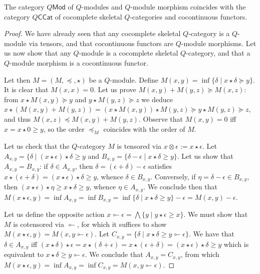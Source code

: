 \begin{theorem}\label{thm:equivalence}
The category $Q\mathsf{Mod}$ of $Q$-modules and $Q$-module morphism coincides with the category $Q\mathsf{CCat}$ of cocomplete skeletal $Q$-categories and cocontinuous functors.
\end{theorem}
\begin{proof}
We have already seen that any cocomplete skeletal $Q$-category is a $Q$-module via tensors, 
and that cocontinuous functors are $Q$-module morphisms.
Let us now show that any $Q$-module is a cocomplete skeletal $Q$-category, and that a $Q$-module morphism is a cocontinuous functor.

Let then $M=(M,\preceq, \star)$ be a $Q$-module. Define $M(x,y)= \inf\{ \delta \mid x\star \delta \succeq y\}$.
 It is clear that $M(x,x)=0$. Let us prove $M(x,y)+M(y,z) \succeq M(x,z)$: 
from $x\star M(x,y)\succeq y$ and $y\star M(y,z)\succeq z$ we deduce 
$x\star(M(x,y)+M(y,z))= (x\star M(x,y))\star M(y,z) \succeq y\star M(y,z)\succeq z$, and thus 
$M(x,z)\preceq M(x,y)+M(y,z)$. 
Observe that $M(x,y)=0$ iff $x=x\star 0\geq y$, so the order $\preceq_{M}$ coincides with the order of $M$.

Let us check that the $Q$-category $M$ is tensored via $x\otimes \epsilon:=x\star\epsilon$.
Let $A_{x,y}= \{ \delta \mid (x\star\epsilon)\star \delta \geq y$ and 
$B_{x,y}=\{\delta-\epsilon\mid x\star \delta \geq y\}$.
Let us show that $A_{x,y}=B_{x,y}$: if $\delta \in A_{x,y}$, then 
$\delta=(\epsilon+\delta)-\epsilon$ satisfies 
$x\star(\epsilon+\delta)=(x\star\epsilon)\star \delta \geq y$, whence 
$\delta\in B_{x,y}$. Conversely, if $\eta=\delta-\epsilon\in B_{x,y}$, then 
$(x\star\epsilon)\star \eta \geq x\star \delta \geq y$, whence $\eta\in A_{x,y}$.
We conclude then that $M(x\star\epsilon,y)=\inf A_{x,y}=\inf B_{x,y}=
\inf\{\delta \mid x\star \delta \geq y\}-\epsilon=M(x,y)-\epsilon$.


Let us define the opposite action $x\multimapinv \epsilon= \bigwedge\{y \mid 
y\star \epsilon \geq x\}$. We must show that $M$ is cotensored via $\multimapinv$, for which it suffices to show $M(x\star \epsilon,y)=M(x,y\multimapinv \epsilon)$. Let $C_{x,y}=\{\delta \mid 
x\star \delta \geq y\multimapinv \epsilon\}$. We have that $\delta \in A_{x,y}$ iff  
$(x\star \delta)\star \epsilon=x\star(\delta+\epsilon)=x\star(\epsilon+\delta)=(x\star \epsilon)\star \delta \geq y$ which is equivalent to $x\star\delta \geq y\multimapinv \epsilon$. We conclude that $A_{x,y}=C_{x,y}$, from which $M(x\star \epsilon,y)=\inf A_{x,y}=\inf C_{x,y}=M(x,y\multimapinv \epsilon)$.




\end{proof}
